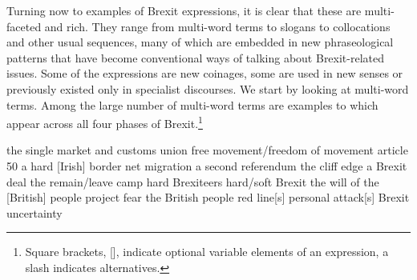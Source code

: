 \documentclass[output=paper]{langscibook}
\begin{document}
Turning now to examples of Brexit expressions, it is clear that these are multi-faceted and rich. They range from multi-word terms to slogans to collocations and other usual sequences, many of which are embedded in new phraseological patterns that have become conventional ways of talking about Brexit-related issues. Some of the expressions are new coinages, some are used in new senses or previously existed only in specialist discourses. We start by looking at multi-word terms. Among the large number of multi-word terms are examples  to  which appear across all four phases of Brexit.\footnote{Square brackets, [], indicate optional variable elements of an expression, a slash indicates alternatives.}

\ea the single market and customs union\label{ex:buerki:1}
\ex{} free movement\slash freedom of movement\label{ex:buerki:2}
\ex\relax [trigger] article 50\label{ex:buerki:3}
\ex{} a hard [Irish] border\label{ex:buerki:4}
\ex{} net migration\label{ex:buerki:5}
\ex\relax a second referendum\label{ex:buerki:6}
\ex\relax the cliff edge\label{ex:buerki:7}
\ex\relax a Brexit deal\label{ex:buerki:8}
\ex\relax the remain\slash leave camp\label{ex:buerki:9}
\ex\relax hard Brexiteers\label{ex:buerki:10}
\ex\relax hard\slash soft Brexit\label{ex:buerki:11}
\ex\relax the will of the [British] people\label{ex:buerki:12}
\ex\relax project fear\label{ex:buerki:13}
\ex\relax the British people\label{ex:buerki:14}
\ex\relax red line[s]\label{ex:buerki:15}
\ex\relax personal attack[s]\label{ex:buerki:16}
\ex\relax Brexit uncertainty\label{ex:buerki:17}
\z
\end{document}

